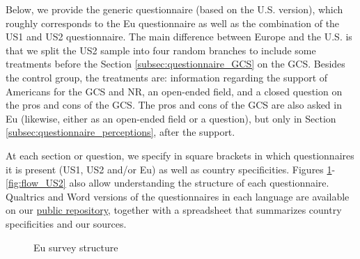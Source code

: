 Below, we provide the generic questionnaire (based on the U.S. version), which roughly corresponds to the Eu questionnaire as well as the combination of the US1 and US2 questionnaire. The main difference between Europe and the U.S. is that we split the US2 sample into four random branches to include some treatments before the Section \ref{subsec:questionnaire_GCS} on the GCS. Besides the control group, the treatments are: information regarding the support of Americans for the GCS and NR, an open-ended field, and a closed question on the pros and cons of the GCS. The pros and cons of the GCS are also asked in Eu (likewise, either as an open-ended field or a question), but only in Section \ref{subsec:questionnaire_perceptions}, after the support. 

At each section or question, we specify in square brackets in which questionnaires it is present (US1, US2 and/or Eu) as well as country specificities. Figures \ref{fig:flow_Eu}-\ref{fig:flow_US2} also allow understanding the structure of each questionnaire. Qualtrics and Word versions of the questionnaires in each language are available on our \href{https://github.com/bixiou/global_tax_attitudes/tree/main/questionnaire}{public repository}, together with a spreadsheet that summarizes country specificities and our sources.

\begin{figure}[h!]
    \caption{Eu survey structure}\label{fig:flow_Eu}
\end{figure}

